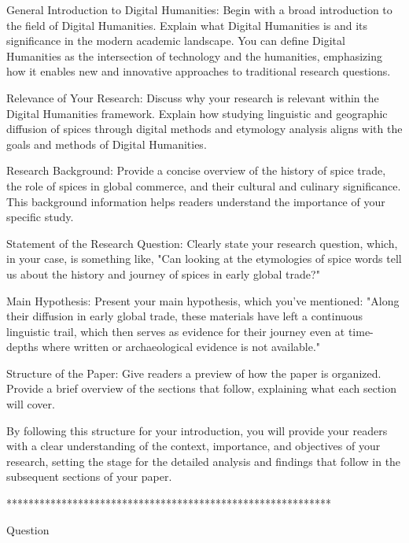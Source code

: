 \documentclass[12pt]{article}
\begin{document}
    General Introduction to Digital Humanities:
        Begin with a broad introduction to the field of Digital Humanities. Explain what Digital Humanities is and its significance in the modern academic landscape. You can define Digital Humanities as the intersection of technology and the humanities, emphasizing how it enables new and innovative approaches to traditional research questions.

    Relevance of Your Research:
        Discuss why your research is relevant within the Digital Humanities framework. Explain how studying linguistic and geographic diffusion of spices through digital methods and etymology analysis aligns with the goals and methods of Digital Humanities.

    Research Background:
        Provide a concise overview of the history of spice trade, the role of spices in global commerce, and their cultural and culinary significance. This background information helps readers understand the importance of your specific study.

    Statement of the Research Question:
        Clearly state your research question, which, in your case, is something like, "Can looking at the etymologies of spice words tell us about the history and journey of spices in early global trade?"

    Main Hypothesis:
        Present your main hypothesis, which you've mentioned: "Along their diffusion in early global trade, these materials have left a continuous linguistic trail, which then serves as evidence for their journey even at time-depths where written or archaeological evidence is not available."

    Structure of the Paper:
        Give readers a preview of how the paper is organized. Provide a brief overview of the sections that follow, explaining what each section will cover.

By following this structure for your introduction, you will provide your readers with a clear understanding of the context, importance, and objectives of your research, setting the stage for the detailed analysis and findings that follow in the subsequent sections of your paper.

***********************************************************

Question
\end{document}
